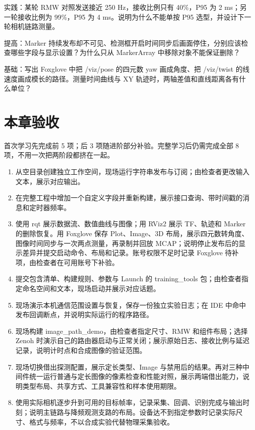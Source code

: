 \begin{problemset}
\item \label{prob:v2-ros-14}实践：某轮 RMW 对照发送接近 250 Hz，接收比例只有 40\%，P95 为 2 ms；另一轮接收比例为 99\%，P95 为 4 ms。说明为什么不能单按 P95 选型，并设计下一轮相机链路测量。
\item \label{prob:v2-ros-15}提高：Marker 持续发布却不可见、检测框开启时间同步后画面停住，分别应该检查哪些字段与显示设置？为什么只从 MarkerArray 中移除对象不能保证删除？
\item \label{prob:v2-ros-16}基础：写出 Foxglove 中把 /viz/pose 的四元数 yaw 画成角度、把 /viz/twist 的线速度画成模长的路径。测量时间曲线与 XY 轨迹时，两轴差值和直线距离各有什么单位？
\end{problemset}

\section{本章验收}
首次学习先完成前 5 项；后 3 项随进阶部分补验。完整学习后仍需完成全部 8 项，不用一次把两阶段都挤在一起。
\begin{enumerate}
    \item 从空目录创建独立工作空间，现场运行字符串发布与订阅；由检查者更改输入文本，展示对应输出。
    \item 在完整工程中增加一个自定义字段并重新构建，展示接口查询、带时间戳的消息和定时器频率。
    \item 使用 rqt 展示数据流、数值曲线与图像；用 RViz2 展示 TF、轨迹和 Marker 的删除恢复。用 Foxglove 保存 Plot、Image、3D 布局，展示四元数转角度、图像时间同步与一次两点测量，再录制并回放 MCAP；说明停止发布后的显示差异并提交启动命令、布局和记录。账号权限不足时记录 Foxglove 待补项，由检查者在可用账号下补验。
    \item 提交包含清单、构建规则、参数与 Launch 的 training\_tools 包；由检查者指定命名空间和文本，现场启动并展示对应话题。
    \item 现场演示本机通信范围设置与恢复，保存一份独立实验日志；在 IDE 中命中发布回调断点，并说明实际运行的程序路径。
    \item 现场构建 image\_path\_demo，由检查者指定尺寸、RMW 和组件布局；选择 Zenoh 时演示自己的路由器启动与正常关闭；展示原始日志、接收比例与延迟记录，说明计时点和合成图像的验证范围。
    \item 现场切换借出探测配置，展示定长类型、Image 与禁用后的结果。再对三种中间件统一运行普通与定长图像的像素检查和性能对照，展示两端借出能力，说明类型布局、共享方式、工具兼容性和样本使用期限。
    \item 使用实际相机逐步升到可用的目标帧率，记录采集、回调、识别完成与输出时刻；说明主链路与降频观测支路的布局。设备达不到指定参数时记录实际尺寸、格式与频率，不以合成实验代替物理采集验收。
\end{enumerate}
